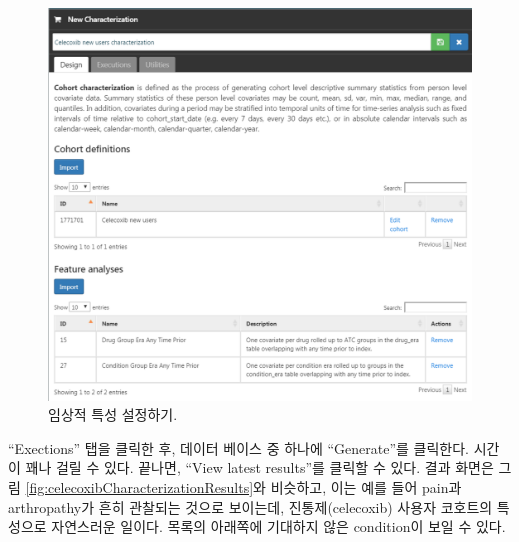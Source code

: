 \documentclass[10.5pt]{book}
\theoremstyle{definition}
\theoremstyle{definition}
\theoremstyle{definition}
\theoremstyle{remark}
\begin{document}
\begin{figure}

{\centering \includegraphics[width=1\linewidth]{images/SuggestedAnswers/celecoxibCharacterization} 

}

\caption{임상적 특성 설정하기.}\label{fig:celecoxibCharacterization}
\end{figure}

``Exections'' 탭을 클릭한 후, 데이터 베이스 중 하나에 ``Generate''를
클릭한다. 시간이 꽤나 걸릴 수 있다. 끝나면, ``View latest results''를
클릭할 수 있다. 결과 화면은 그림
\ref{fig:celecoxibCharacterizationResults}와 비슷하고, 이는 예를 들어
pain과 arthropathy가 흔히 관찰되는 것으로 보이는데, 진통제(celecoxib)
사용자 코호트의 특성으로 자연스러운 일이다. 목록의 아래쪽에 기대하지
않은 condition이 보일 수 있다.
\end{document}
